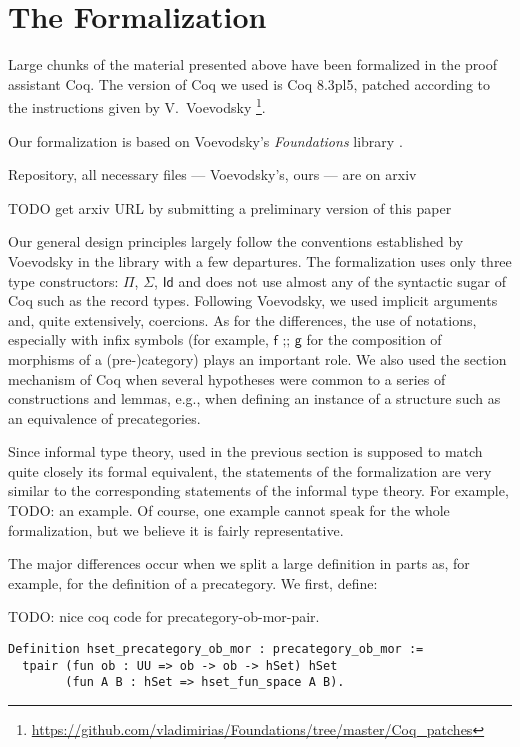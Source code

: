 
\section{The Formalization}
\label{sec:formalization}

Large chunks of the material presented above have been formalized in the proof assistant \textsf{Coq}.
The version of \textsf{Coq} we used is \textsf{Coq} 8.3pl5, patched according to the instructions given by
V.\ Voevodsky \footnote{\url{https://github.com/vladimirias/Foundations/tree/master/Coq_patches}}.

Our formalization is based on Voevodsky's \emph{Foundations} library \cite{vv_foundations}.

Repository, all necessary files --- Voevodsky's, ours --- are on arxiv

TODO get arxiv URL by submitting a preliminary version of this paper

Our general design principles largely follow the conventions established by Voevodsky in the library \cite{vv_foundations} with a few departures. 
The formalization uses only three type constructors: $\Pi$, $\Sigma$, $\textsf{Id}$ and does not use 
almost any of the syntactic sugar of \textsf{Coq} such as the record types. 
Following Voevodsky, we used implicit arguments and, quite extensively, coercions. 
As for the differences, the use of notations, especially with infix symbols (for example, $\textsf{f ;; g}$ for 
the composition of morphisms of a (pre-)category) plays an important role. We also used the section mechanism of \textsf{Coq} 
when several hypotheses were common to a series of constructions and lemmas, e.g., 
when defining an instance of a structure such as an equivalence of precategories.

Since informal type theory, used in the previous section is supposed to match quite closely its formal equivalent, 
the statements of the formalization are very similar to the corresponding statements of the informal type theory. 
For example, TODO: an example. Of course, one example cannot speak for the whole formalization, but we believe it is fairly representative.

The major differences occur when we split a large definition in parts as, for example, for the definition of a precategory. We first, define:

TODO: nice coq code for precategory-ob-mor-pair.
\begin{lstlisting}
Definition hset_precategory_ob_mor : precategory_ob_mor :=
  tpair (fun ob : UU => ob -> ob -> hSet) hSet 
        (fun A B : hSet => hset_fun_space A B).
\end{lstlisting}


